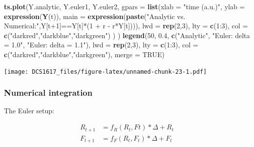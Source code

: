 \documentclass[]{book}
\newenvironment{Shaded}{\begin{snugshade}}{\end{snugshade}}
\newcommand{\KeywordTok}[1]{\textcolor[rgb]{0.13,0.29,0.53}{\textbf{{#1}}}}
\newcommand{\DataTypeTok}[1]{\textcolor[rgb]{0.13,0.29,0.53}{{#1}}}
\newcommand{\DecValTok}[1]{\textcolor[rgb]{0.00,0.00,0.81}{{#1}}}
\newcommand{\FloatTok}[1]{\textcolor[rgb]{0.00,0.00,0.81}{{#1}}}
\newcommand{\StringTok}[1]{\textcolor[rgb]{0.31,0.60,0.02}{{#1}}}
\newcommand{\OtherTok}[1]{\textcolor[rgb]{0.56,0.35,0.01}{{#1}}}
\newcommand{\NormalTok}[1]{{#1}}
\begin{document}
\begin{Shaded}
\begin{Highlighting}[]
\KeywordTok{ts.plot}\NormalTok{(Y.analytic, Y.euler1, Y.euler2,}
        \DataTypeTok{gpars =} \KeywordTok{list}\NormalTok{(}\DataTypeTok{xlab =} \StringTok{"time (a.u.)"}\NormalTok{,}
                     \DataTypeTok{ylab =} \KeywordTok{expression}\NormalTok{(}\KeywordTok{Y}\NormalTok{(t)),}
                     \DataTypeTok{main =} \KeywordTok{expression}\NormalTok{(}\KeywordTok{paste}\NormalTok{(}\StringTok{"Analytic vs. Numerical:"}\NormalTok{,Y[t}\DecValTok{+1}\NormalTok{]==Y[t]*(}\DecValTok{1} \NormalTok{+}\StringTok{ }\NormalTok{r -}\StringTok{ }\NormalTok{r*Y[t]))),}
                     \DataTypeTok{lwd =} \KeywordTok{rep}\NormalTok{(}\DecValTok{2}\NormalTok{,}\DecValTok{3}\NormalTok{),}
                     \DataTypeTok{lty =} \KeywordTok{c}\NormalTok{(}\DecValTok{1}\NormalTok{:}\DecValTok{3}\NormalTok{),}
                     \DataTypeTok{col =} \KeywordTok{c}\NormalTok{(}\StringTok{"darkred"}\NormalTok{,}\StringTok{"darkblue"}\NormalTok{,}\StringTok{"darkgreen"}\NormalTok{)}
                     \NormalTok{)}
        \NormalTok{)}
\KeywordTok{legend}\NormalTok{(}\DecValTok{50}\NormalTok{, }\FloatTok{0.4}\NormalTok{, }\KeywordTok{c}\NormalTok{(}\StringTok{"Analytic"}\NormalTok{,}
                 \StringTok{"Euler: delta = 1.0"}\NormalTok{, }
                 \StringTok{"Euler: delta = 1.1"}\NormalTok{),}
       \DataTypeTok{lwd =} \KeywordTok{rep}\NormalTok{(}\DecValTok{2}\NormalTok{,}\DecValTok{3}\NormalTok{), }\DataTypeTok{lty =} \KeywordTok{c}\NormalTok{(}\DecValTok{1}\NormalTok{:}\DecValTok{3}\NormalTok{), }\DataTypeTok{col =} \KeywordTok{c}\NormalTok{(}\StringTok{"darkred"}\NormalTok{,}\StringTok{"darkblue"}\NormalTok{,}\StringTok{"darkgreen"}\NormalTok{), }\DataTypeTok{merge =} \OtherTok{TRUE}\NormalTok{)}
\end{Highlighting}
\end{Shaded}

\texttt{[image: DCS1617\_files/figure-latex/unnamed-chunk-23-1.pdf]}

\subsubsection*{Numerical integration}\label{numerical-integration}

The Euler setup:

\begin{align}
R_{t+1} &= f_R(R_t,Ft) * \Delta + R_t \\
F_{t+1} &= f_F(R_t,F_t) * \Delta + F_t
\end{align}
\end{document}
